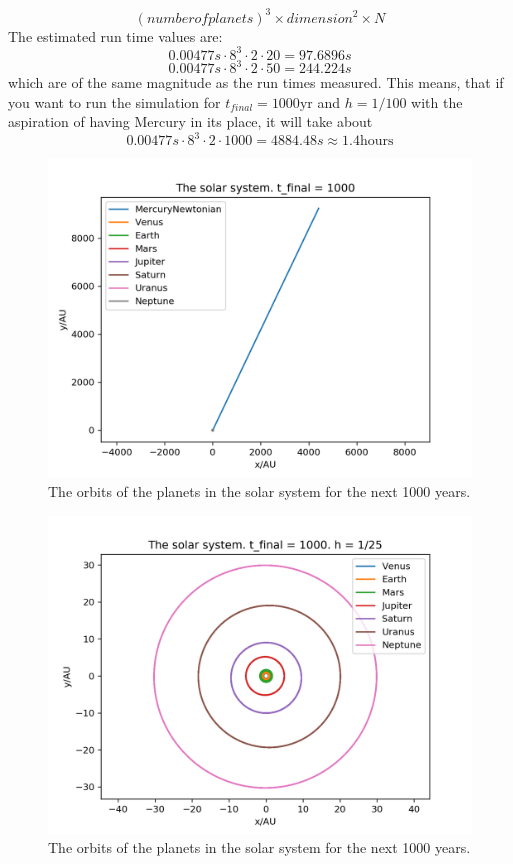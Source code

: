 \documentclass{article}
\begin{document}
$$(number  of planets)^3 \times dimension^2  \times N$$
The estimated run time values are: 
$$0.00477s \cdot 8^3 \cdot 2 \cdot 20=97.6896s$$
$$0.00477s \cdot 8^3 \cdot 2 \cdot 50=244.224s$$
which are of the same magnitude as the run times measured. This means, that if you want to run the simulation for $t_{final}=1000\textrm{yr}$ and $h=1/100$ with the aspiration of having Mercury in its place, it will take about
$$0.00477s \cdot 8^3 \cdot 2 \cdot 1000=4884.48s \approx 1.4 \textrm{hours}$$

\begin{figure}
  \includegraphics[width=\linewidth]{solar_system1000Newtonian.png}
  \caption{The orbits of the planets in the solar system for the next 1000 years.}
  \label{fig:solar_system1000}
\end{figure}

\begin{figure}
  \includegraphics[width=\linewidth]{solar_systemNoMercury.png}
  \caption{The orbits of the planets in the solar system for the next 1000 years.}
  \label{fig:solar_systemNoMercury}
\end{figure}
\end{document}
